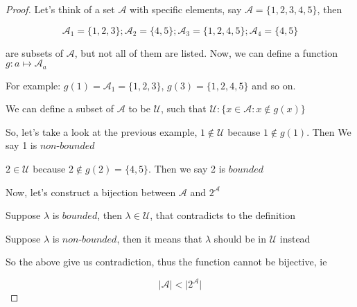 \documentclass[12pt]{article}
\begin{document}
\begin{proof}
    
    Let's think of a set $\mathcal{A}$ with specific elements, say $\mathcal{A}
    = \lbrace 1, 2, 3, 4, 5 \rbrace$, then

    \[ \mathcal{A}_1 = \lbrace 1,2,3\rbrace ; \mathcal{A}_2 = \lbrace 4,5\rbrace; 
    \mathcal{A}_3 = \lbrace 1,2,4,5 \rbrace; \mathcal{A}_4 = \lbrace 4,5 \rbrace \]
    
    \vspace*{0.3cm}
    \hspace*{1cm}
    are subsets of $\mathcal{A}$, but not all of them are listed.
    Now, we can define a function $ g : a \mapsto \mathcal{A}_a $

    \vspace*{0.3cm}
    \hspace*{1cm}
    For example: $ g(1) = \mathcal{A}_1 = \lbrace 1, 2, 3 \rbrace $, $ g(3) = 
    \lbrace 1, 2, 4 ,5 \rbrace $ and so on.

    \vspace*{0.3cm}
    \hspace*{1cm}
    We can define a subset of $\mathcal{A}$ to be $\mathcal{U}$, such that $ \mathcal{U} :
    \lbrace x \in \mathcal{A} : x \notin g(x) \rbrace  $

    \vspace*{0.3cm}
    \hspace*{1cm}
    So, let's take a look at the previous example, $ 1 \notin \mathcal{U} $ because
    $ 1 \notin g(1) $. Then We say 1 is $\textit{non-bounded}$

    \vspace*{0.3cm}
    \hspace*{1cm}
    $ 2 \in \mathcal{U} $ because $ 2 \notin g(2) = \lbrace 4, 5 \rbrace $.
     Then we say 2 is $\textit{bounded}$

    \vspace*{0.3cm}
    \hspace*{1cm}
    Now, let's construct a bijection between $ \mathcal{A} $ and $2^{\mathcal{A}}$

    \newpage
    \hspace*{1cm}
    Suppose $ \lambda $
    is $bounded$, then $\lambda \in \mathcal{U}$, that contradicts to the definition
    
    \vspace*{0.3cm}
    \hspace*{1cm}
    Suppose  $\lambda$ is $\textit{non-bounded}$, then it means that $\lambda$ should be in $\mathcal{U}$
    instead
    
    
    \vspace*{0.3cm}
    \hspace*{1cm}
    So the above give us contradiction, thus the function cannot be bijective, ie 

    \[ \vert \mathcal{A} \vert < \vert 2^{\mathcal{A}} \vert \]
    



\end{proof}
\end{document}
